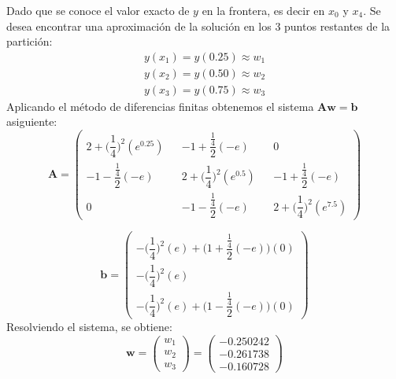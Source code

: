 \begin{frame}
Dado que se conoce el valor exacto de $y$ en la frontera, es decir en $x_0$ y $x_4$. Se desea encontrar una aproximación de la solución en los 3 puntos restantes de la partición: 
\begin{displaymath}
\begin{array}{r}
y(x_1)=y(0.25)\approx w_1\\
y(x_2)=y(0.50)\approx w_2\\
y(x_3)=y(0.75)\approx w_3
\end{array}
\end{displaymath}
Aplicando el método de diferencias finitas obtenemos el sistema $\mathbf{Aw=b}$ asiguiente:
\begin{displaymath}
\mathbf{A}=\begin{pmatrix}
2+\bigg(\dfrac{1}{4}\bigg)^2(e^{0.25}) & & -1+\dfrac{\frac{1}{4}}{2}(-e) & &0\\ 
-1-\dfrac{\frac{1}{4}}{2}(-e) && 2+\bigg(\dfrac{1}{4}\bigg)^2(e^{0.5}) & &-1+\dfrac{\frac{1}{4}}{2}(-e) \\
0 & & -1-\dfrac{\frac{1}{4}}{2}(-e) && 2+\bigg(\dfrac{1}{4}\bigg)^2(e^{7.5})
\end{pmatrix}
\end{displaymath}
\end{frame}

\begin{frame}
\begin{displaymath}
\mathbf{b}=
\begin{pmatrix}
-\bigg(\dfrac{1}{4}\bigg)^2(e)+\bigg(1+\dfrac{\frac{1}{4}}{2}(-e)\bigg)(0)\\
-\bigg(\dfrac{1}{4}\bigg)^2(e)\\
-\bigg(\dfrac{1}{4}\bigg)^2(e)+\bigg(1-\dfrac{\frac{1}{4}}{2}(-e)\bigg)(0)
\end{pmatrix}
\end{displaymath}
Resolviendo el sistema, se obtiene:
\begin{displaymath}
\mathbf{w}=\begin{pmatrix}
w_1\\
w_2\\
w_3
\end{pmatrix}
=
\begin{pmatrix}
-0.250242\\
-0.261738\\
-0.160728
\end{pmatrix}
\end{displaymath}
\end{frame}